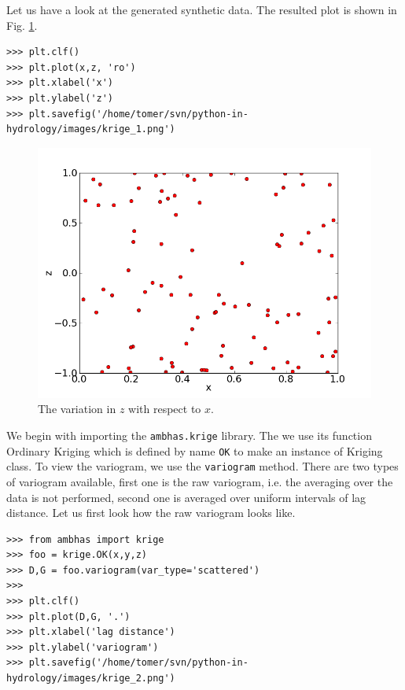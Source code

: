 \documentclass[10pt]{book}
\begin{document}
{Let us have a look at the generated synthetic data. The resulted plot is shown in Fig. \ref{fig:krige_1}. 

\beforeverb \begin{verbatim}
>>> plt.clf()
>>> plt.plot(x,z, 'ro')
>>> plt.xlabel('x')
>>> plt.ylabel('z')
>>> plt.savefig('/home/tomer/svn/python-in-hydrology/images/krige_1.png')
\end{verbatim} \afterverb

\beforefig
\begin{figure}[h!]
  \centering
    \includegraphics[scale=0.5]{images/krige_1.png}
  \caption{The variation in $z$ with respect to $x$.}
   \label{fig:krige_1}
\end{figure}
\afterfig

We begin with importing the \verb"ambhas.krige" library. The we use its function Ordinary Kriging which is defined by name \verb"OK" to make an instance of Kriging class. To view the variogram, we use the \verb"variogram" method. There are two types of variogram available, first one is the raw variogram, i.e. the averaging over the data is not performed, second one is averaged over uniform intervals of lag distance. Let us first look how the raw variogram looks like. 

\beforeverb \begin{verbatim}
>>> from ambhas import krige
>>> foo = krige.OK(x,y,z)
>>> D,G = foo.variogram(var_type='scattered')
>>> 
>>> plt.clf()
>>> plt.plot(D,G, '.')
>>> plt.xlabel('lag distance')
>>> plt.ylabel('variogram')
>>> plt.savefig('/home/tomer/svn/python-in-hydrology/images/krige_2.png')
\end{verbatim} \afterverb

}
\end{document}
